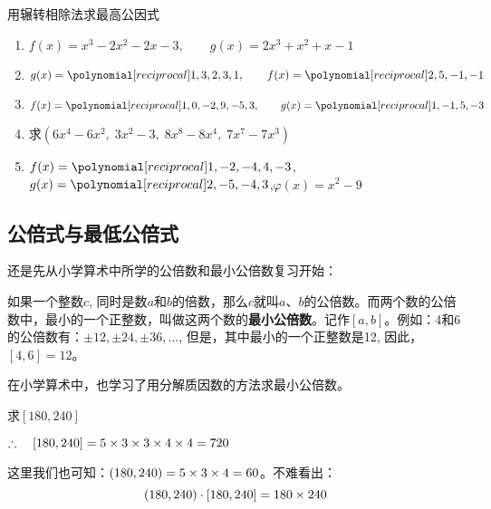 \begin{ex}
用辗转相除法求最高公因式
\begin{enumerate}
    \item $f (x) =x^3-2x^2-2x-3,\qquad g (x) =2x^3+x^2+x-1$
    \item $g(x)=\poly{1,3,2,3,1},\qquad f(x)=\poly{2,5,-1,-1}$
    \item $f(x)=\poly{1,0,-2,9,-5,3},\qquad g(x)=\poly{1,-1,5,-3}$
    \item 求$(6x^4-6x^2,\; 3x^2-3,\; 8x^8-8x^4,\; 7x^7-7x^3)$
    \item $f(x)=\poly{1,-2,-4,4,-3}$,\qquad $g(x)=\poly{2,-5,-4,3}$,\qquad $\varphi(x)=x^2-9$
\end{enumerate}
\end{ex}




\subsection{公倍式与最低公倍式}
还是先从小学算术中所学的公倍数和最小公倍数复习开始：

如果一个整数$c$, 同时是数$a$和$b$的倍数，那么$c$就叫$a$、$b$的公倍数。而两个数的公倍数中，最小的一个正整数，叫做这两个数的\textbf{最小公倍数}。记作$[a,b]$。例如：4和6的公倍数有：$\pm 12,\pm 24,\pm 36,\ldots$, 但是，其中最小的一个正整数是12, 因此，$[4, 6]=12$。

在小学算术中，也学习了用分解质因数的方法求最小公倍数。

\begin{example}
求$[180, 240]$
\end{example}

\begin{solution}
\begin{center}
\end{center}

$\therefore\quad [180, 240] =5\times3\times3\times4\times4=720$

这里我们也可知：$(180, 240)=5\times3\times4=60$。不难看出：
\[(180, 240)\cdot [180, 240]=180\times 240\]

\end{solution}

